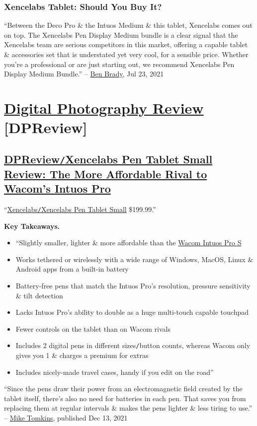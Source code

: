 \documentclass[oneside]{book}
\numberwithin{equation}{section}
\begin{document}
\subsection{Xencelabs Tablet: Should You Buy It?}
``Between the Deco Pro \& the Intuos Medium \& this tablet, Xencelabs comes out on top. The Xencelabs Pen Display Medium bundle is a clear signal that the Xencelabs team are serious competitors in this market, offering a capable tablet \& accessories set that is understated yet very cool, for a sensible price. Whether you're a professional or are just starting out, we recommend Xencelabs Pen Display Medium Bundle.'' -- \href{https://www.creativebloq.com/author/ben-brady}{Ben Brady}, Jul 23, 2021


\chapter{\href{https://www.dpreview.com/}{Digital Photography Review} [DPReview]}

\section{\href{https://www.dpreview.com/reviews/xencelabs-pen-tablet-small-review-the-more-affordable-rival-to-wacom-intuos-pro}{DPReview\texttt{/}Xencelabs Pen Tablet Small Review: The More Affordable Rival to Wacom's Intuos Pro}}
``\href{https://www.xencelabs.com/product/xencelabs-pen-tablet-small/}{Xencelabs\texttt{/}Xencelabs Pen Tablet Small} \$199.99.''

\textbf{Key Takeaways.}
\begin{itemize}
	\item ``Slightly smaller, lighter \& more affordable than the \href{https://www.wacom.com/en-us/products/pen-tablets/wacom-intuos-pro#Use}{Wacom Intuos Pro S}
	\item Works tethered or wirelessly with a wide range of Windows, MacOS, Linux \& Android apps from a built-in battery
	\item Battery-free pens that match the Intuos Pro's resolution, pressure sensitivity \& tilt detection
	\item Lacks Intuos Pro's ability to double as a huge multi-touch capable touchpad
	\item Fewer controls on the tablet than on Wacom rivals
	\item Includes 2 digital pens in different sizes\texttt{/}button counts, whereas Wacom only gives you 1 \& charges a premium for extras
	\item Includes nicely-made travel cases, handy if you edit on the road''
\end{itemize}
``Since the pens draw their power from an electromagnetic field created by the tablet itself, there's also no need for batteries in each pen. That saves you from replacing them at regular intervals \& makes the pens lighter \& less tiring to use.'' -- \href{https://www.dpreview.com/members/6245232230}{Mike Tomkins}, published Dec 13, 2021
\end{document}
